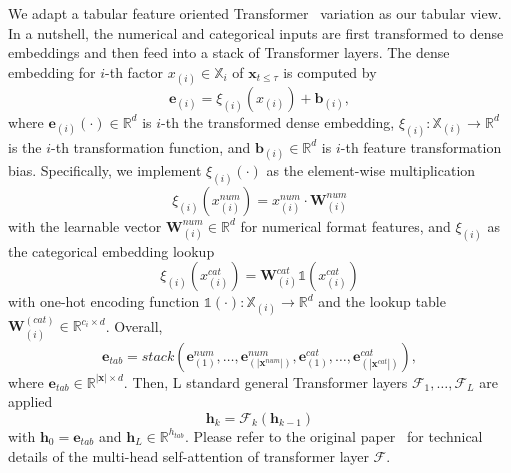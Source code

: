 We adapt a tabular feature oriented Transformer~\cite{huang2020tabtransformer,gorishniy2021FT-Trans} variation as our tabular view. In a nutshell, the numerical and categorical inputs are first transformed to dense embeddings and then feed into a stack of Transformer layers. The dense embedding for $i$-th factor $x_{(i)} \in \mathbb{X}_i$ of $\mathbf{x}_{t\leq\tau}$ is computed by
\begin{equation}
    \mathbf{e}_{(i)}=\xi_{(i)}(x_{(i)})+\mathbf{b}_{(i)},
\end{equation}
where $\mathbf{e}_{(i)}(\cdot) \in \mathbb{R}^d$ is $i$-th the transformed dense embedding, $\xi_{(i)}: \mathbb{X}_{(i)} \rightarrow \mathbb{R}^d$ is the $i$-th transformation function, and $\mathbf{b}_{(i)} \in \mathbb{R}^d$ is $i$-th feature transformation bias. 
Specifically, we implement $\xi_{(i)}(\cdot)$ as the element-wise multiplication 
\begin{equation}
\xi_{(i)}(x_{(i)}^{num})=x_{(i)}^{num}\cdot \mathbf{W}_{(i)}^{num}
\end{equation}
with the learnable vector $\mathbf{W}_{(i)}^{num} \in \mathbb{R}^d$ for numerical format features, and $\xi_{(i)}$ as the categorical embedding lookup 
\begin{equation}
\xi_{(i)}(x_{(i)}^{cat})=\mathbf{W}_{(i)}^{cat} \mathbb{1}(x_{(i)}^{cat})
\end{equation}
with one-hot encoding function $\mathbb{1}(\cdot): \mathbb{X}_{(i)}\rightarrow \mathbb{R}^d$ and the lookup table $\mathbf{W}_{(i)}^{(cat)} \in \mathbb{R}^{c_{i}\times d}$. 
Overall, 
\begin{equation}
    \mathbf{e}_{tab}= stack(\mathbf{e}_{(1)}^{num},\dots,\mathbf{e}_{(|\mathbf{x}^{num}|)}^{num},\mathbf{e}_{(1)}^{cat},\dots,\mathbf{e}_{(|\mathbf{x}^{cat}|)}^{cat}),
\end{equation}
where $\mathbf{e}_{tab} \in \mathbb{R}^{\mathbf{|x|}\times d}$. Then, L standard general Transformer layers $\mathcal{F}_1, \dots, \mathcal{F}_L$ are applied 
\begin{equation}
\mathbf{h}_k=\mathcal{F}_{k}(\mathbf{h}_{k-1})
\label{eq:multi_transformer}
\end{equation}
with $\mathbf{h}_{0}=\mathbf{e}_{tab}$ and $\mathbf{h}_L\in\mathbb{R}^{h_{tab}}$. Please refer to the original paper~\cite{vaswani2017attention} for technical details of the multi-head self-attention of transformer layer $\mathcal{F}$. 

